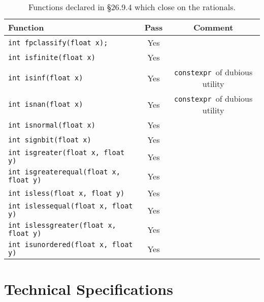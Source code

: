 \documentclass[prd,preprint,amsmath,amssymb,nofootinbib,eqsecnum]{revtex4-1}
\newcommand{\code}[1]{{\tt #1}}
\newcommand{\constexpr}{\code{constexpr}}
\begin{document}
\begin{table}[h]
	\begin{tabular}{lcc}
		Function & Pass & Comment
	\\
	\hline \hline
		\code{int fpclassify(float x);} & Yes &
	\\
	\hline
		\code{int isfinite(float x)} & Yes &
	\\
	\hline
		\code{int isinf(float x)} & Yes & \constexpr\ of dubious utility 
	\\
	\hline
		\code{int isnan(float x)} & Yes & \constexpr\ of dubious utility 
	\\
	\hline
		\code{int isnormal(float x)} & Yes &
	\\
	\hline
		\code{int signbit(float x)} & Yes &
	\\
	\hline
		\code{int isgreater(float x, float y)} & Yes &
	\\
	\hline
		\code{int isgreaterequal(float x, float y)} & Yes &
	\\
	\hline
		\code{int isless(float x, float y)} & Yes &
	\\
	\hline
		\code{int islessequal(float x, float y)} & Yes &
	\\
	\hline
		\code{int islessgreater(float x, float y)} & Yes &
	\\
	\hline
		\code{int isunordered(float x, float y)} & Yes &
	\end{tabular}
\caption{Functions declared in \S 26.9.4 which close on the rationals.}
\label{tab:26.9.4}
\end{table}

\section{Technical Specifications}

\end{document}
